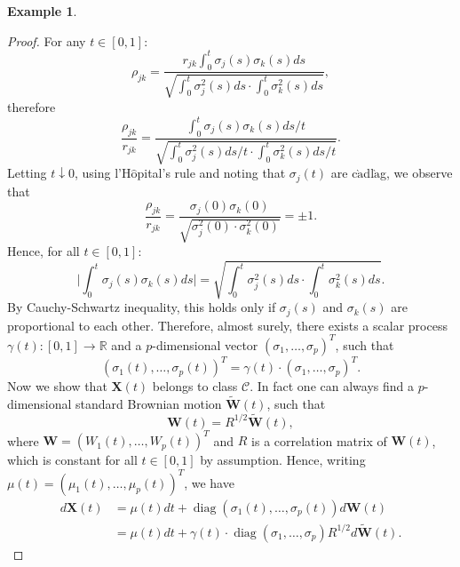 \documentclass[a4paper,11pt]{book}
\theoremstyle{plain}
\theoremstyle{definition}
\newtheorem{exmp}[thm]{Example}
\newcommand{\MR}{\mathbb{R}}
\newcommand{\diag}{\operatorname{diag}}
\begin{document}
\begin{exmp}
    	\begin{proof}
    		For any $t \in [0, 1]$: 
    		\[ \rho_{jk} = \frac{r_{jk} \int_{0}^{t} \sigma_j(s) \sigma_k(s) ds }{\sqrt{\int_{0}^{t} \sigma_j^2(s) ds \cdot \int_{0}^{t} \sigma_k^2(s) ds}}, \]
    		therefore
    		\[ \frac{\rho_{jk}}{r_{jk}} = \frac{\int_{0}^{t} \sigma_j(s) \sigma_k(s) ds/t }{\sqrt{\int_{0}^{t} \sigma_j^2(s) ds/t \cdot \int_{0}^{t} \sigma_k^2(s) ds/t}}. \]
    		Letting $t \downarrow 0$, using l'H$\hat{\text{o}}$pital's rule and noting that $\sigma_j(t)$ are c$\grave{\text{a}}$dl$\grave{\text{a}}$g, we observe that
    		\[ \frac{\rho_{jk}}{r_{jk}} = \frac{\sigma_j(0) \sigma_k(0)}{ \sqrt{\sigma_j^2(0) \cdot \sigma_k^2(0) }} = \pm 1. \]
    		Hence, for all $t \in [0, 1]$:
    		\[ \bigg| \int_{0}^{t}\sigma_j(s) \sigma_k(s) ds \bigg| = \sqrt{\int_{0}^{t} \sigma_j^2(s) ds \cdot \int_{0}^{t} \sigma_k^2(s) ds} . \]
    		By Cauchy-Schwartz inequality, this holds only if $\sigma_j(s)$ and $\sigma_k(s)$ are proportional to each other. Therefore, almost surely, there exists a scalar process $\gamma(t) : [0, 1] \rightarrow \MR$ and a $p$-dimensional vector $(\sigma_1, \dots, \sigma_p)^T$, such that
    		\[ (\sigma_1(t), \dots, \sigma_p(t))^T = \gamma(t) \cdot (\sigma_1, \dots, \sigma_p)^T. \]
    		Now we show that $\mathbf{X}(t)$ belongs to class $\mathcal{C}$. In fact one can always find a $p$-dimensional standard Brownian motion $\widetilde{\mathbf{W}}(t)$, such that 
    		\[ \mathbf{W}(t) = R^{1/2}\widetilde{\mathbf{W}}(t), \]
    		where $\mathbf{W} = (W_1(t), \dots, W_p(t))^T$ and $R$ is a correlation matrix of $\mathbf{W}(t)$, which is constant for all $t \in [0, 1]$ by assumption. Hence, writing $\mu(t) = (\mu_1(t), \dots, \mu_p(t))^T$, we have
    		\[ 
    		\begin{aligned}
    		d\mathbf{X}(t) & = \mu(t) dt + \diag(\sigma_1(t), \dots, \sigma_p(t)) d\mathbf{W}(t) \\
    		&  = \mu(t) dt +\gamma(t) \cdot \diag(\sigma_1, \dots, \sigma_p) R^{1/2} d\widetilde{\mathbf{W}}(t).
    		\end{aligned} \]
    	\end{proof}
    \end{exmp}
    
\end{document}
